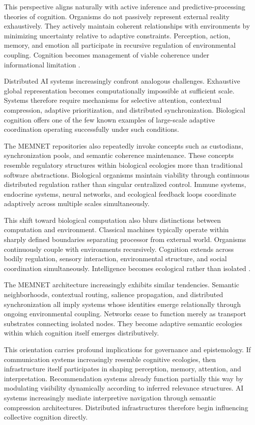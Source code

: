 \documentclass[11pt,a4paper]{article}
\begin{document}
This perspective aligns naturally with active inference and predictive-processing theories of cognition. Organisms do not passively represent external reality exhaustively. They actively maintain coherent relationships with environments by minimizing uncertainty relative to adaptive constraints. Perception, action, memory, and emotion all participate in recursive regulation of environmental coupling. Cognition becomes management of viable coherence under informational limitation \cite{friston2010}.

Distributed AI systems increasingly confront analogous challenges. Exhaustive global representation becomes computationally impossible at sufficient scale. Systems therefore require mechanisms for selective attention, contextual compression, adaptive prioritization, and distributed synchronization. Biological cognition offers one of the few known examples of large-scale adaptive coordination operating successfully under such conditions.

The MEMNET repositories also repeatedly invoke concepts such as custodians, synchronization pools, and semantic coherence maintenance. These concepts resemble regulatory structures within biological ecologies more than traditional software abstractions. Biological organisms maintain viability through continuous distributed regulation rather than singular centralized control. Immune systems, endocrine systems, neural networks, and ecological feedback loops coordinate adaptively across multiple scales simultaneously.

This shift toward biological computation also blurs distinctions between computation and environment. Classical machines typically operate within sharply defined boundaries separating processor from external world. Organisms continuously couple with environments recursively. Cognition extends across bodily regulation, sensory interaction, environmental structure, and social coordination simultaneously. Intelligence becomes ecological rather than isolated \cite{clark1998}.

The MEMNET architecture increasingly exhibits similar tendencies. Semantic neighborhoods, contextual routing, salience propagation, and distributed synchronization all imply systems whose identities emerge relationally through ongoing environmental coupling. Networks cease to function merely as transport substrates connecting isolated nodes. They become adaptive semantic ecologies within which cognition itself emerges distributively.

This orientation carries profound implications for governance and epistemology. If communication systems increasingly resemble cognitive ecologies, then infrastructure itself participates in shaping perception, memory, attention, and interpretation. Recommendation systems already function partially this way by modulating visibility dynamically according to inferred relevance structures. AI systems increasingly mediate interpretive navigation through semantic compression architectures. Distributed infrastructures therefore begin influencing collective cognition directly.
\end{document}
